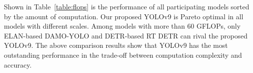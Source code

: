 \documentclass[10pt,twocolumn,letterpaper]{article}
\begin{document}
	Shown in Table~\ref{table:flops} is the performance of all participating models sorted by the amount of computation. Our proposed YOLOv9 is Pareto optimal in all models with different scales. Among models with more than 60 GFLOPs, only ELAN-based DAMO-YOLO and DETR-based RT DETR can rival the proposed YOLOv9. The above comparison results show that YOLOv9 has the most outstanding performance in the trade-off between computation complexity and accuracy.
	
\end{document}
